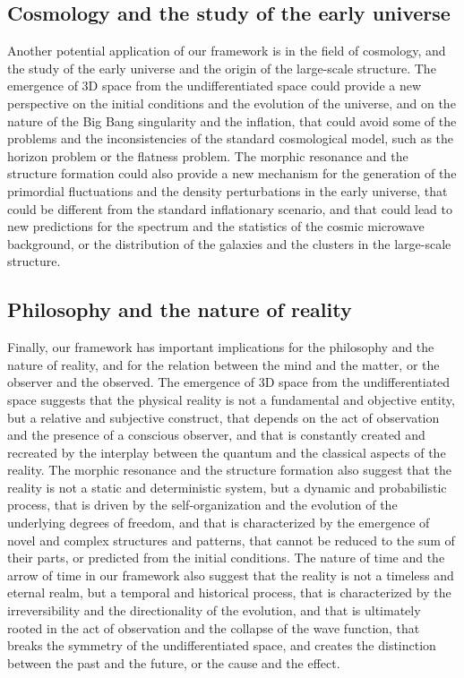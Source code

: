 \subsection{Cosmology and the study of the early universe}
Another potential application of our framework is in the field of cosmology, and the study of the early universe and the origin of the large-scale structure. The emergence of 3D space from the undifferentiated space could provide a new perspective on the initial conditions and the evolution of the universe, and on the nature of the Big Bang singularity and the inflation, that could avoid some of the problems and the inconsistencies of the standard cosmological model, such as the horizon problem or the flatness problem. The morphic resonance and the structure formation could also provide a new mechanism for the generation of the primordial fluctuations and the density perturbations in the early universe, that could be different from the standard inflationary scenario, and that could lead to new predictions for the spectrum and the statistics of the cosmic microwave background, or the distribution of the galaxies and the clusters in the large-scale structure.

\subsection{Philosophy and the nature of reality}
Finally, our framework has important implications for the philosophy and the nature of reality, and for the relation between the mind and the matter, or the observer and the observed. The emergence of 3D space from the undifferentiated space suggests that the physical reality is not a fundamental and objective entity, but a relative and subjective construct, that depends on the act of observation and the presence of a conscious observer, and that is constantly created and recreated by the interplay between the quantum and the classical aspects of the reality. The morphic resonance and the structure formation also suggest that the reality is not a static and deterministic system, but a dynamic and probabilistic process, that is driven by the self-organization and the evolution of the underlying degrees of freedom, and that is characterized by the emergence of novel and complex structures and patterns, that cannot be reduced to the sum of their parts, or predicted from the initial conditions. The nature of time and the arrow of time in our framework also suggest that the reality is not a timeless and eternal realm, but a temporal and historical process, that is characterized by the irreversibility and the directionality of the evolution, and that is ultimately rooted in the act of observation and the collapse of the wave function, that breaks the symmetry of the undifferentiated space, and creates the distinction between the past and the future, or the cause and the effect.

